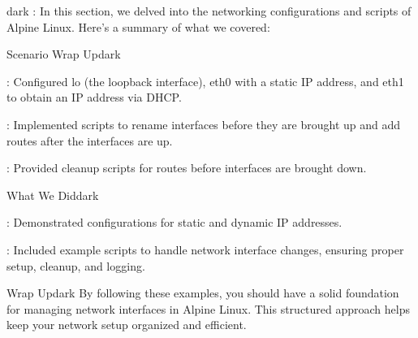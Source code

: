 \begin{baseBoxThree}{}{dark}
    \bigskip
    : In this section, we delved into the networking configurations and scripts of Alpine Linux. Here's a summary of what we covered:
    \bigskip
    \label{Scenario Wrap Up}
    \begin{baseBoxThree}{Scenario Wrap Up}{dark}
        \smallskip
        \begin{posnexItemize}
            \item[\sA] : Configured lo (the loopback interface), eth0 with a static IP address, and eth1 to obtain an IP address via DHCP.
            \item[\sA] : Implemented scripts to rename interfaces before they are brought up and add routes after the interfaces are up.
            \item[\sA] : Provided cleanup scripts for routes before interfaces are brought down.
        \end{posnexItemize}
        \smallskip
    \end{baseBoxThree}
    \smallskip
    \begin{baseBoxThree}{What We Did}{dark}
        \smallskip
        \begin{posnexItemize}
            \item[\sA] : Demonstrated configurations for static and dynamic IP addresses.
            \item[\sA] : Included example scripts to handle network interface changes, ensuring proper setup, cleanup, and logging.
        \end{posnexItemize}
        \smallskip
    \end{baseBoxThree}
    \smallskip
    \begin{baseBoxThree}{Wrap Up}{dark}
        \smallskip
        By following these examples, you should have a solid foundation for managing network interfaces in Alpine Linux.
        This structured approach helps keep your network setup organized and efficient.
        \smallskip
    \end{baseBoxThree}
    \smallskip
\end{baseBoxThree}
